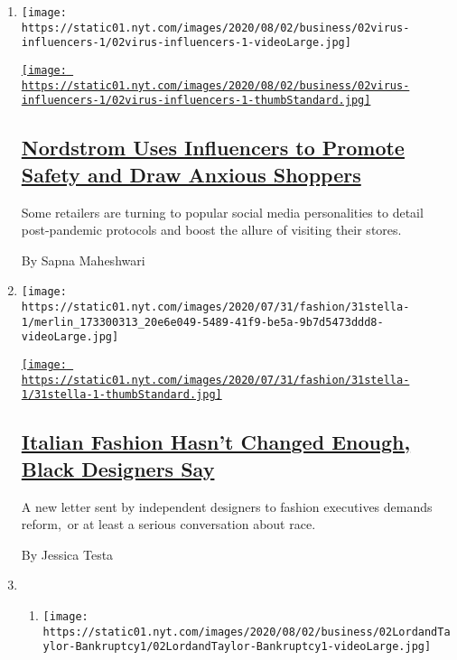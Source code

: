 \begin{enumerate}
\def\labelenumi{\arabic{enumi}.}
\item
  \texttt{[image: https://static01.nyt.com/images/2020/08/02/business/02virus-influencers-1/02virus-influencers-1-videoLarge.jpg]}

  \href{/2020/08/02/business/media/coronavirus-nordstrom-infuencers.html}{\texttt{[image: https://static01.nyt.com/images/2020/08/02/business/02virus-influencers-1/02virus-influencers-1-thumbStandard.jpg]}}

  \hypertarget{nordstrom-uses-influencers-to-promote-safety-and-draw-anxious-shoppers}{%
  \subsection{\texorpdfstring{\href{/2020/08/02/business/media/coronavirus-nordstrom-infuencers.html}{Nordstrom
  Uses Influencers to Promote Safety and Draw Anxious
  Shoppers}}{Nordstrom Uses Influencers to Promote Safety and Draw Anxious Shoppers}}\label{nordstrom-uses-influencers-to-promote-safety-and-draw-anxious-shoppers}}

  Some retailers are turning to popular social media personalities to
  detail post-pandemic protocols and boost the allure of visiting their
  stores.

  By Sapna Maheshwari
\item
  \texttt{[image: https://static01.nyt.com/images/2020/07/31/fashion/31stella-1/merlin\_173300313\_20e6e049-5489-41f9-be5a-9b7d5473ddd8-videoLarge.jpg]}

  \href{/2020/07/31/fashion/italian-fashion-black-designers.html}{\texttt{[image: https://static01.nyt.com/images/2020/07/31/fashion/31stella-1/31stella-1-thumbStandard.jpg]}}

  \hypertarget{italian-fashion-hasnt-changed-enough-black-designers-say}{%
  \subsection{\texorpdfstring{\href{/2020/07/31/fashion/italian-fashion-black-designers.html}{Italian
  Fashion Hasn't Changed Enough, Black Designers
  Say}}{Italian Fashion Hasn't Changed Enough, Black Designers Say}}\label{italian-fashion-hasnt-changed-enough-black-designers-say}}

  A new letter sent by independent designers to fashion executives
  demands reform,~or at least a serious conversation about race.

  By Jessica Testa
\item
  \begin{enumerate}
  \def\labelenumii{\arabic{enumii}.}
  \item
    \texttt{[image: https://static01.nyt.com/images/2020/08/02/business/02LordandTaylor-Bankruptcy1/02LordandTaylor-Bankruptcy1-videoLarge.jpg]}


\end{enumerate}
\end{enumerate}

